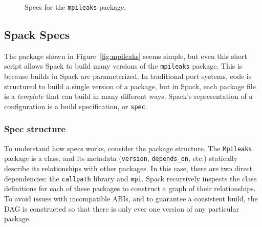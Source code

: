 \begin{figure}
	\caption{
		Specs for the {\tt mpileaks} package.
		\label{fig:specs}
	}
\end{figure}


\subsection{Spack Specs}\label{sec:specs}

The package shown in Figure~\ref{fig:mpileaks} seems simple, but even this short script
allows Spack to build many versions of the {\tt mpileaks} package.  This is because builds
in Spack are parameterized.  In traditional port systems, code is structured to build a single
version of a package, but in Spack, each package file is a {\it template} that can build 
in many different ways.  Spack's representation of a configuration is a build specification, 
or {\tt spec}.

\subsubsection{Spec structure}
To understand how specs works, consider the package structure.  The  {\tt Mpileaks} package
is a class, and its metadata ({\tt version}, {\tt depends\_on}, etc.) statically describe
its relationships with other packages.  In this case, there are two direct dependencies: 
the {\tt callpath} library and {\tt mpi}.  Spack recursively inspects the class definitions
for each of these packages to construct a graph of their relationships.  
To avoid issues with incompatible ABIs, and to guarantee a consistent build, the DAG is constructed
so that there is only ever one version of any particular package.

